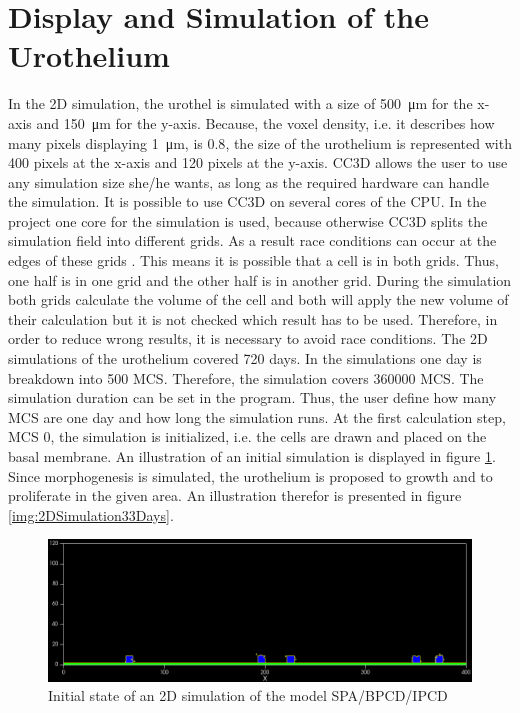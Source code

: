 \section{Display and Simulation of the Urothelium}
In the 2D simulation, the urothel is simulated with a size of \SI{500}{\micro\metre} for the x-axis and \SI{150}{\micro\metre} for the y-axis. Because, the voxel density, i.e. it describes how many pixels displaying \SI{1}{\micro\metre}, is $0.8$, the size of the urothelium is represented with 400 pixels at the x-axis and 120 pixels at the y-axis. \ac{CC3D} allows the user to use any simulation size she/he wants, as long as the required hardware can handle the simulation. \newline
It is possible to use \ac{CC3D} on several cores of the CPU. In the project one core for the simulation is used, because otherwise \ac{CC3D} splits the simulation field into different grids. As a result race conditions can occur at the edges of these grids \cite{MaciejH.Swat2017}. This means it is possible that a cell is in both grids. Thus, one half is in one grid and the other half is in another grid. During the simulation both grids calculate the volume of the cell and both will apply the new volume of their calculation but it is not checked which result has to be used. Therefore, in order to reduce wrong results, it is necessary to avoid race conditions. \newline 
The 2D simulations of the urothelium covered 720 days. In the simulations one day is breakdown into 500 \ac{MCS}. Therefore, the simulation covers 360000 \ac{MCS}. The simulation duration can be set in the program. Thus, the user define how many \ac{MCS} are one day and how long the simulation runs. At the first calculation step, \ac{MCS} 0, the simulation is initialized, i.e. the cells are drawn and placed on the basal membrane. An illustration of an initial simulation is displayed in figure \ref{img:2DSimulationInitialState}. Since morphogenesis is simulated, the urothelium is proposed to growth and to proliferate in the given area. An illustration therefor is presented in figure \ref{img:2DSimulation33Days}.

\begin{figure}
	\center
	\includegraphics[scale=0.35]{figures/2DSimulation-InitialState.png}
	\caption{Initial state of an 2D simulation of the model SPA/BPCD/IPCD}
	\label{img:2DSimulationInitialState}
\end{figure}

